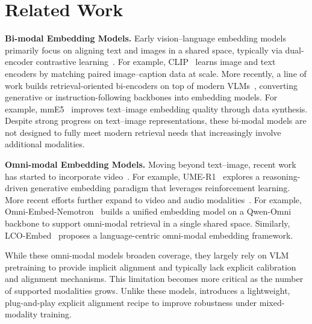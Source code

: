 \section{Related Work}

\noindent \textbf{Bi-modal Embedding Models.}
Early vision--language embedding models primarily focus on aligning text and images in a shared space, typically via dual-encoder contrastive learning~\citep{ALIGN,CLIP,BLIP,blip2}.
For example, CLIP~\citep{CLIP} learns image and text encoders by matching paired image--caption data at scale.
More recently, a line of work builds retrieval-oriented bi-encoders on top of modern VLMs~\citep{MMEB,GME,mme5,B3,Moca}, converting generative or instruction-following backbones into embedding models.
For example, mmE5~\citep{mme5} improves text--image embedding quality through data synthesis.
Despite strong progress on text--image representations, these bi-modal models are not designed to fully meet modern retrieval needs that increasingly involve additional modalities.

\noindent \textbf{Omni-modal Embedding Models.}
Moving beyond text--image, recent work has started to incorporate video~\citep{MMEB-v2,UME-R1,UniME-V2}.
For example, UME-R1~\citep{UME-R1} explores a reasoning-driven generative embedding paradigm that leverages reinforcement learning.
More recent efforts further expand to video and audio modalities~\citep{tevatron-omni,Nemotron,LCO-Embed}.
For example, Omni-Embed-Nemotron~\citep{Nemotron} builds a unified embedding model on a Qwen-Omni backbone to support omni-modal retrieval in a single shared space.
Similarly, LCO-Embed~\citep{LCO-Embed} proposes a language-centric omni-modal embedding framework.

While these omni-modal models broaden coverage, they largely rely on VLM pretraining to provide implicit alignment and typically lack explicit calibration and alignment mechanisms.
This limitation becomes more critical as the number of supported modalities grows.
Unlike these models, \ours{} introduces a lightweight, plug-and-play explicit alignment recipe to improve robustness under mixed-modality training.



